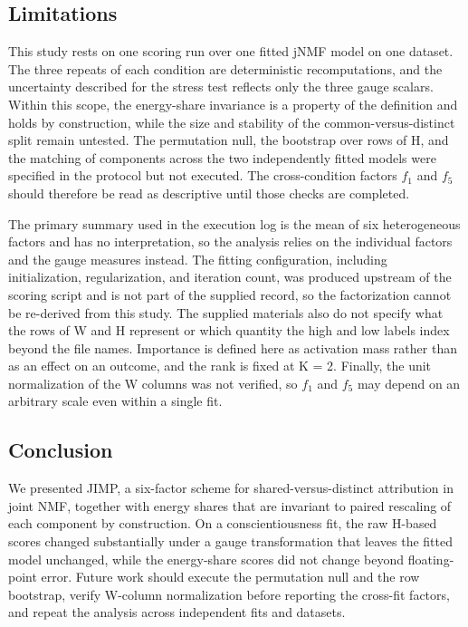 \documentclass{article}
\begin{document}
\subsection{Limitations}

\label{sec:limitations}

This study rests on one scoring run over one fitted jNMF model on one dataset. The three repeats of each condition are deterministic recomputations, and the uncertainty described for the stress test reflects only the three gauge scalars. Within this scope, the energy-share invariance is a property of the definition and holds by construction, while the size and stability of the common-versus-distinct split remain untested. The permutation null, the bootstrap over rows of H, and the matching of components across the two independently fitted models were specified in the protocol but not executed. The cross-condition factors $f_1$ and $f_5$ should therefore be read as descriptive until those checks are completed.

The primary summary used in the execution log is the mean of six heterogeneous factors and has no interpretation, so the analysis relies on the individual factors and the gauge measures instead. The fitting configuration, including initialization, regularization, and iteration count, was produced upstream of the scoring script and is not part of the supplied record, so the factorization cannot be re-derived from this study. The supplied materials also do not specify what the rows of W and H represent or which quantity the high and low labels index beyond the file names. Importance is defined here as activation mass rather than as an effect on an outcome, and the rank is fixed at K = 2. Finally, the unit normalization of the W columns was not verified, so $f_1$ and $f_5$ may depend on an arbitrary scale even within a single fit.

\subsection{Conclusion}

\label{sec:conclusion}

We presented JIMP, a six-factor scheme for shared-versus-distinct attribution in joint NMF, together with energy shares that are invariant to paired rescaling of each component by construction. On a conscientiousness fit, the raw H-based scores changed substantially under a gauge transformation that leaves the fitted model unchanged, while the energy-share scores did not change beyond floating-point error. Future work should execute the permutation null and the row bootstrap, verify W-column normalization before reporting the cross-fit factors, and repeat the analysis across independent fits and datasets.
\end{document}
